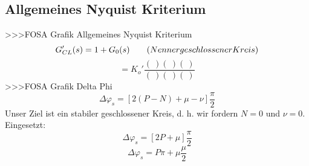 \subsection{Allgemeines Nyquist Kriterium}
>>>FOSA Grafik Allgemeines Nyquist Kriterium
\[ G'_{CL}(s) = 1 + G_0(s) \qquad \text(Nenner geschlossener Kreis) \]
\[ = K_o' \frac{(~) (~) (~)}{(~) (~) (~)} \]
>>>FOSA Grafik Delta Phi
\[ \Delta\varphi_s = [2 (P - N) + \mu - \nu] \frac{\pi}{2} \]
Unser Ziel ist ein stabiler geschlossener Kreis, d. h. wir fordern $N = 0$ und $\nu = 0$. Eingesetzt: 
\[ \Delta\varphi_s = [2 P + \mu] \frac{\pi}{2} \]
\[ \Delta\varphi_s = P \pi + \mu \frac{\mu}{2} \]

